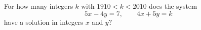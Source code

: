 For how many integers $k$ with $1910<k<2010$ does the system
\[
5x-4y=7,\qquad 4x+5y=k
\]
have a solution in integers $x$ and $y$?
